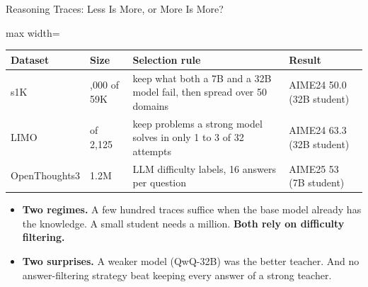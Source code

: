 \begin{frame}{Reasoning Traces: Less Is More, or More Is More?}
    \begin{center}
    \small
    \begin{adjustbox}{max width=\linewidth}\begin{tabular}{l>{\raggedright\arraybackslash}p{2.3cm}>{\raggedright\arraybackslash}p{5.6cm}>{\raggedright\arraybackslash}p{3.3cm}}
        \toprule
        \textbf{Dataset} & \textbf{Size} & \textbf{Selection rule} & \textbf{Result} \\
        \midrule
        s1K & 1,000 of 59K & keep what both a 7B and a 32B model fail, then spread over 50 domains & AIME24 50.0 (32B student) \\
        LIMO & 800 of 2,125 & keep problems a strong model solves in only 1 to 3 of 32 attempts & AIME24 63.3 (32B student) \\
        OpenThoughts3 & 1.2M & LLM difficulty labels, 16 answers per question & AIME25 53 (7B student) \\
        \bottomrule
    \end{tabular}\end{adjustbox}
    \end{center}
    \begin{itemize}\itemsep0.4em
        \item \textbf{Two regimes.} A few hundred traces suffice when the base model already has the knowledge. A small student needs a million. \textbf{Both rely on difficulty filtering.}
        \item \textbf{Two surprises.} A weaker model (QwQ-32B) was the better teacher. And no answer-filtering strategy beat keeping every answer of a strong teacher.
    \end{itemize}
\end{frame}

